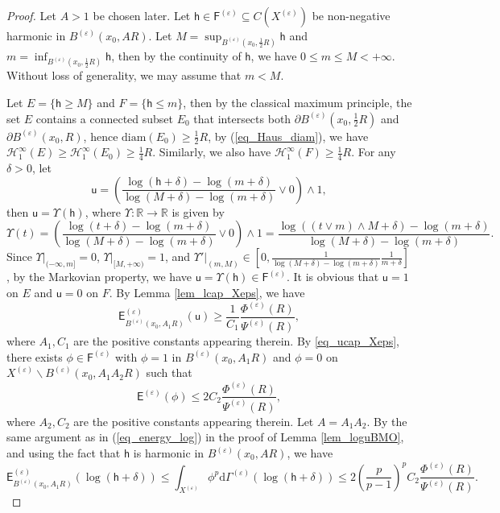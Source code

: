 \documentclass[11pt,a4paper]{article}
\numberwithin{equation}{section}
\theoremstyle{plain}
\theoremstyle{definition}
\begin{document}
\begin{proof}
Let $A>1$ be chosen later. Let $\mathsf{h}\in \mathsf{F}^{(\varepsilon)}\subseteq C(X^{(\varepsilon)})$ be non-negative harmonic in $B^{(\varepsilon)}(x_0,AR)$. Let $M=\sup_{B^{(\varepsilon)}(x_0,\frac{1}{2}R)}\mathsf{h}$ and $m=\inf_{B^{(\varepsilon)}(x_0,\frac{1}{2}R)}\mathsf{h}$, then by the continuity of $\mathsf{h}$, we have $0\le m\le M<+\infty$. Without loss of generality, we may assume that $m<M$.

Let $E=\{\mathsf{h}\ge M\}$ and $F=\{\mathsf{h}\le m\}$, then by the classical maximum principle, the set $E$ contains a connected subset $E_0$ that intersects both $\partial B^{(\varepsilon)}(x_0,\frac{1}{2}R)$ and $\partial B^{(\varepsilon)}(x_0,R)$, hence $\mathrm{diam}(E_0)\ge \frac{1}{2}R$, by (\ref{eq_Haus_diam}), we have $\mathcal{H}_1^\infty(E)\ge \mathcal{H}_1^{\infty}(E_0)\ge \frac{1}{4}R$. Similarly, we also have $\mathcal{H}_1^\infty(F)\ge \frac{1}{4}R$. For any $\delta>0$, let
$$\mathsf{u}=\left(\frac{\log(\mathsf{h}+\delta)-\log(m+\delta)}{\log(M+\delta)-\log(m+\delta)}\vee0\right)\wedge1,$$
then $\mathsf{u}=\Upsilon(\mathsf{h})$, where $\Upsilon:\mathbb{R}\to \mathbb{R}$ is given by
$$\Upsilon(t)=\left(\frac{\log(t+\delta)-\log(m+\delta)}{\log(M+\delta)-\log(m+\delta)}\vee0\right)\wedge1=\frac{\log \left((t\vee m)\wedge M+\delta\right)-\log(m+\delta)}{\log(M+\delta)-\log(m+\delta)}.$$
Since $\Upsilon|_{(-\infty,m]}=0$, $\Upsilon|_{[M,+\infty)}=1$, and $\Upsilon'|_{(m,M)}\in[0,\frac{1}{\log(M+\delta)-\log(m+\delta)}\frac{1}{m+\delta}]$, by the Markovian property, we have $\mathsf{u}=\Upsilon(\mathsf{h})\in \mathsf{F}^{(\varepsilon)}$. It is obvious that $\mathsf{u}=1$ on $E$ and $\mathsf{u}=0$ on $F$. By Lemma \ref{lem_lcap_Xeps}, we have
$$\mathsf{E}^{(\varepsilon)}_{B^{(\varepsilon)}(x_0,A_1R)}(\mathsf{u})\ge \frac{1}{C_1}\frac{\Phi^{(\varepsilon)}(R)}{\Psi^{(\varepsilon)}(R)},$$
where $A_1,C_1$ are the positive constants appearing therein. By \ref{eq_ucap_Xeps}, there exists $\phi\in \mathsf{F}^{(\varepsilon)}$ with $\phi=1$ in $B^{(\varepsilon)}(x_0,A_1R)$ and $\phi=0$ on $X^{(\varepsilon)}\backslash B^{(\varepsilon)}(x_0,A_1A_2R)$ such that
$$\mathsf{E}^{(\varepsilon)}(\phi)\le 2C_2 \frac{\Phi^{(\varepsilon)}(R)}{\Psi^{(\varepsilon)}(R)},$$
where $A_2, C_2$ are the positive constants appearing therein. Let $A=A_1A_2$. By the same argument as in (\ref{eq_energy_log}) in the proof of Lemma \ref{lem_loguBMO}, and using the fact that $\mathsf{h}$ is harmonic in $B^{(\varepsilon)}(x_0,AR)$, we have
$$\mathsf{E}^{(\varepsilon)}_{B^{(\varepsilon)}(x_0,A_1R)}\left(\log(\mathsf{h}+\delta)\right)\le\int_{X^{(\varepsilon)}}\phi^p\mathrm{d}\Gamma^{(\varepsilon)}\left(\log (\mathsf{h}+\delta)\right)\le 2 \left(\frac{p}{p-1}\right)^pC_2 \frac{\Phi^{(\varepsilon)}(R)}{\Psi^{(\varepsilon)}(R)}.$$

\end{proof}
\end{document}
